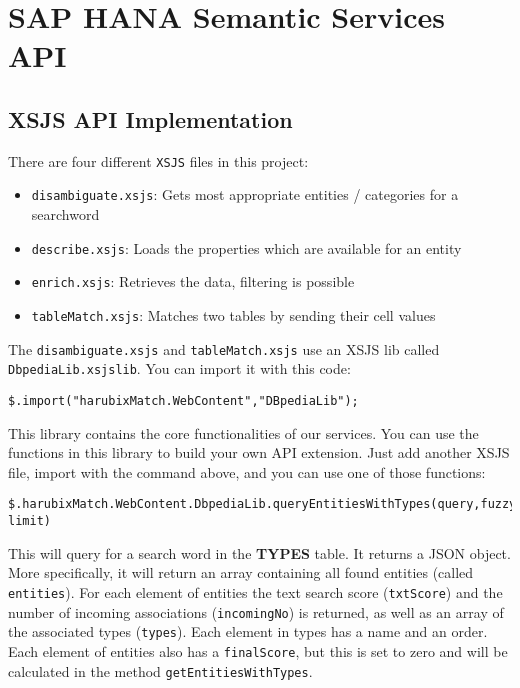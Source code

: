 \chapter{SAP HANA Semantic Services API} \label{appendix:appendixF}

\section{XSJS API Implementation}
\label{section:xsjsAPI}

There are four different \texttt{XSJS} files in this project:

\begin{itemize}
	\item \texttt{disambiguate.xsjs}: Gets most appropriate entities / categories for a searchword
	\item \texttt{describe.xsjs}: Loads the properties which are available for an entity
	\item \texttt{enrich.xsjs}: Retrieves the data, filtering is possible \item \texttt{tableMatch.xsjs}: Matches two tables by sending their cell values
\end{itemize}

The \texttt{disambiguate.xsjs} and \texttt{tableMatch.xsjs} use an XSJS lib called \\\texttt{DbpediaLib.xsjslib}. You can import it with this code:

\begin{verbatim}
$.import("harubixMatch.WebContent","DBpediaLib");
\end{verbatim}

This library contains the core functionalities of our services. You can use the functions in this library to build your own API extension. Just add another XSJS file, import with the command above, and you can use one of those functions:

\scriptsize
\begin{verbatim}
$.harubixMatch.WebContent.DbpediaLib.queryEntitiesWithTypes(query,fuzzyStr, limit)
\end{verbatim}
\normalsize

This will query for a search word in the \textbf{TYPES} table. It returns a JSON object. More specifically, it will return an array containing all found entities (called \texttt{entities}). For each element of entities the text search score (\texttt{txtScore}) and the number of incoming associations (\texttt{incomingNo}) is returned, as well as an array of the associated types (\texttt{types}). Each element in types has a name and an order. Each element of entities also has a \texttt{finalScore}, but this is set to zero and will be calculated in the method \texttt{getEntitiesWithTypes}.

